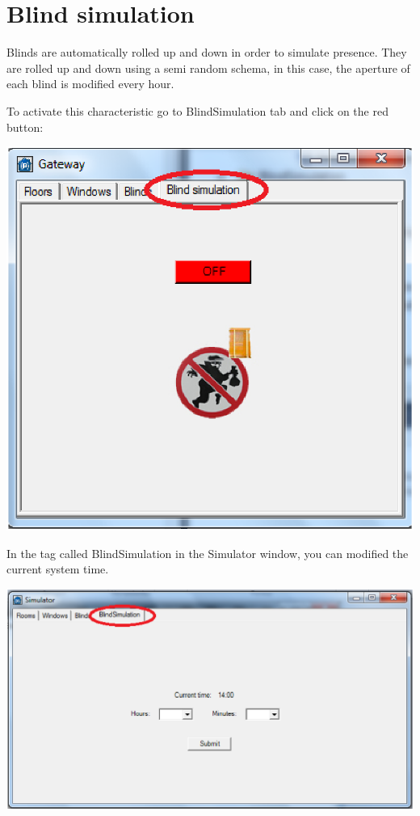 \section{Blind simulation}
Blinds are automatically rolled up and down in order to simulate presence. They are rolled up and down using a semi random schema, in this case, the aperture of each blind is modified every hour.

To activate this characteristic go to BlindSimulation tab and click on the red button:
\begin{center}
	\includegraphics[width=.65\linewidth]{images/globalBlindSimulation.eps}
	\\
\vspace{1cm}
\end{center}

In the tag called BlindSimulation in the Simulator window, you can modified the current system time.
\begin{center}
	\includegraphics[width=.99\linewidth]{images/simulatorBlindSimulation.eps}
	\\
\vspace{1cm}
\end{center}

